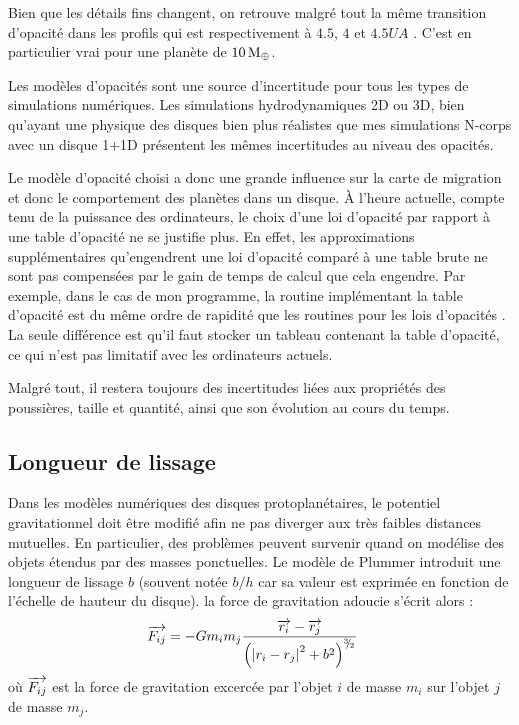 Bien que les détails fins changent, on retrouve malgré tout la même transition d'opacité dans les profils \citep{bell1994FU, zhu2009nonsteady, hure2000transition} qui est respectivement à $4.5$, $4$ et $4.5\unit{UA}$ . C'est en particulier vrai pour une planète de $10\mathrm{\thinspace M_\oplus}$.

\bigskip

Les modèles d'opacités sont une source d'incertitude pour tous les types de simulations numériques. Les simulations hydrodynamiques 2D ou 3D, bien qu'ayant une physique des disques bien plus réalistes que mes simulations N-corps avec un disque 1+1D présentent les mêmes incertitudes au niveau des opacités.

Le modèle d'opacité choisi a donc une grande influence sur la carte de migration et donc le comportement des planètes dans un
disque. À l'heure actuelle, compte tenu de la puissance des ordinateurs, le choix d'une loi d'opacité par rapport à une table
d'opacité ne se justifie plus. En effet, les approximations supplémentaires qu'engendrent une loi d'opacité comparé
à une table brute ne sont pas compensées par le gain de temps de calcul que cela engendre. Par exemple, dans le cas de mon programme, la routine
implémentant la table d'opacité \cite{hure2000transition} est du même ordre de rapidité que les routines pour les lois d'opacités \citep{bell1994FU, zhu2009nonsteady, chambers2009analytic}. La seule différence est qu'il
faut stocker un tableau contenant la table d'opacité, ce qui n'est pas limitatif avec les ordinateurs actuels.

Malgré tout, il restera toujours des incertitudes liées aux propriétés des poussières, taille et quantité, ainsi que son évolution
au cours du temps. 

\subsection{Longueur de lissage}
Dans les modèles numériques des disques protoplanétaires, le potentiel gravitationnel doit être modifié afin ne pas diverger aux
très faibles distances mutuelles. En particulier, des problèmes peuvent survenir quand on modélise des objets étendus par des
masses ponctuelles. Le modèle de Plummer introduit une longueur de lissage $b$ (souvent notée $b/h$ car sa valeur est exprimée
en fonction de l'échelle de hauteur du disque). la force de gravitation adoucie s'écrit alors : 
\begin{align}
{\overrightarrow{F_{ij}}} &= -G m_i m_j \frac{{\overrightarrow{r_i}} - {\overrightarrow{r_j}}}{\left(\left|r_i - r_j\right|^2 + b^2\right)^{{}^{3\!\!}/ _{\!2}}}
\end{align}
où ${\overrightarrow{F_{ij}}}$ est la force de gravitation excercée par l'objet $i$ de masse $m_i$ sur l'objet $j$ de masse $m_j$.


